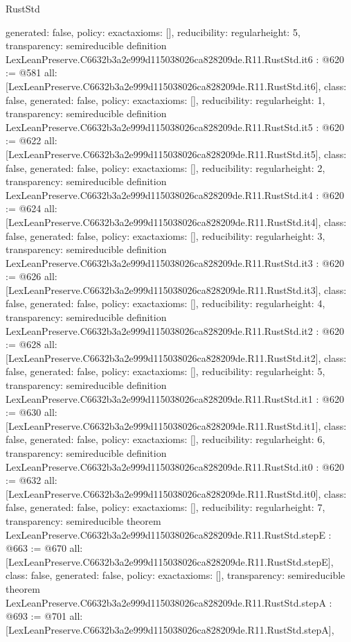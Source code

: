 \begin{lexlean}{RustStd}
\begin{coremodule}
{  generated: false,
  policy: exact{axioms: []},
  reducibility: regular{height: 5},
  transparency: semireducible
}
definition LexLeanPreserve.C6632b3a2e999d115038026ca828209de.R11.RustStd.it6 : @620 := @581 {
  all: [LexLeanPreserve.C6632b3a2e999d115038026ca828209de.R11.RustStd.it6],
  class: false,
  generated: false,
  policy: exact{axioms: []},
  reducibility: regular{height: 1},
  transparency: semireducible
}
definition LexLeanPreserve.C6632b3a2e999d115038026ca828209de.R11.RustStd.it5 : @620 := @622 {
  all: [LexLeanPreserve.C6632b3a2e999d115038026ca828209de.R11.RustStd.it5],
  class: false,
  generated: false,
  policy: exact{axioms: []},
  reducibility: regular{height: 2},
  transparency: semireducible
}
definition LexLeanPreserve.C6632b3a2e999d115038026ca828209de.R11.RustStd.it4 : @620 := @624 {
  all: [LexLeanPreserve.C6632b3a2e999d115038026ca828209de.R11.RustStd.it4],
  class: false,
  generated: false,
  policy: exact{axioms: []},
  reducibility: regular{height: 3},
  transparency: semireducible
}
definition LexLeanPreserve.C6632b3a2e999d115038026ca828209de.R11.RustStd.it3 : @620 := @626 {
  all: [LexLeanPreserve.C6632b3a2e999d115038026ca828209de.R11.RustStd.it3],
  class: false,
  generated: false,
  policy: exact{axioms: []},
  reducibility: regular{height: 4},
  transparency: semireducible
}
definition LexLeanPreserve.C6632b3a2e999d115038026ca828209de.R11.RustStd.it2 : @620 := @628 {
  all: [LexLeanPreserve.C6632b3a2e999d115038026ca828209de.R11.RustStd.it2],
  class: false,
  generated: false,
  policy: exact{axioms: []},
  reducibility: regular{height: 5},
  transparency: semireducible
}
definition LexLeanPreserve.C6632b3a2e999d115038026ca828209de.R11.RustStd.it1 : @620 := @630 {
  all: [LexLeanPreserve.C6632b3a2e999d115038026ca828209de.R11.RustStd.it1],
  class: false,
  generated: false,
  policy: exact{axioms: []},
  reducibility: regular{height: 6},
  transparency: semireducible
}
definition LexLeanPreserve.C6632b3a2e999d115038026ca828209de.R11.RustStd.it0 : @620 := @632 {
  all: [LexLeanPreserve.C6632b3a2e999d115038026ca828209de.R11.RustStd.it0],
  class: false,
  generated: false,
  policy: exact{axioms: []},
  reducibility: regular{height: 7},
  transparency: semireducible
}
theorem LexLeanPreserve.C6632b3a2e999d115038026ca828209de.R11.RustStd.stepE : @663 := @670 {
  all: [LexLeanPreserve.C6632b3a2e999d115038026ca828209de.R11.RustStd.stepE],
  class: false,
  generated: false,
  policy: exact{axioms: []},
  transparency: semireducible
}
theorem LexLeanPreserve.C6632b3a2e999d115038026ca828209de.R11.RustStd.stepA : @693 := @701 {
  all: [LexLeanPreserve.C6632b3a2e999d115038026ca828209de.R11.RustStd.stepA],
}
\end{coremodule}
\end{lexlean}
